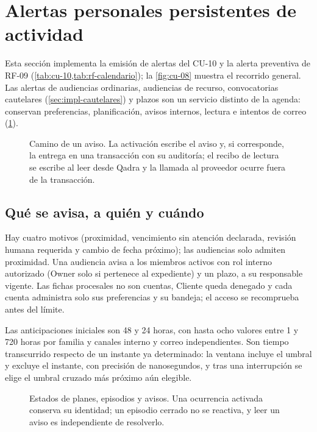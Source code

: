 \section{Alertas personales persistentes de actividad}\label{sec:implementacion-alertas}

Esta sección implementa la emisión de alertas del CU-10 y la alerta preventiva de RF-09 (\cref{tab:cu-10,tab:rf-calendario}); la \cref{fig:cu-08} muestra el recorrido general. Las alertas de audiencias ordinarias, audiencias de recurso, convocatorias cautelares (\cref{sec:impl-cautelares}) y plazos son un servicio distinto de la agenda: conservan preferencias, planificación, avisos internos, lectura e intentos de correo (\cref{fig:impl-alertas-flujo}).

\begin{figure}[!htbp]
  \centering
  
  \caption{Camino de un aviso. La activación escribe el aviso y, si corresponde, la entrega en una transacción con su auditoría; el recibo de lectura se escribe al leer desde Qadra y la llamada al proveedor ocurre fuera de la transacción.}
  \label{fig:impl-alertas-flujo}
\end{figure}

\subsection{Qué se avisa, a quién y cuándo}

Hay cuatro motivos (proximidad, vencimiento sin atención declarada, revisión humana requerida y cambio de fecha próximo); las audiencias solo admiten proximidad. Una audiencia avisa a los miembros activos con rol interno autorizado (Owner solo si pertenece al expediente) y un plazo, a su responsable vigente. Las fichas procesales no son cuentas, Cliente queda denegado y cada cuenta administra solo sus preferencias y su bandeja; el acceso se recomprueba antes del límite.

Las anticipaciones iniciales son 48 y 24 horas, con hasta ocho valores entre 1 y 720 horas por familia y canales interno y correo independientes. Son tiempo transcurrido respecto de un instante ya determinado: la ventana incluye el umbral y excluye el instante, con precisión de nanosegundos, y tras una interrupción se elige el umbral cruzado más próximo aún elegible.

\begin{figure}[!htbp]
  \centering
  
  \caption{Estados de planes, episodios y avisos. Una ocurrencia activada conserva su identidad; un episodio cerrado no se reactiva, y leer un aviso es independiente de resolverlo.}
  \label{fig:impl-alertas-estados}
\end{figure}

